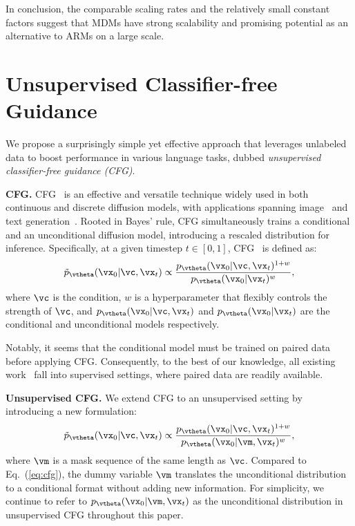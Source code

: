 \documentclass{article} %
\begin{document}
In conclusion, the comparable scaling rates and the relatively small constant factors suggest that MDMs have strong scalability and promising potential as an alternative to ARMs on a large scale.



\section{Unsupervised Classifier-free Guidance}
\label{sec:cfg}


We propose a surprisingly simple yet effective approach that leverages unlabeled data to boost performance in various language tasks, dubbed \emph{unsupervised classifier-free guidance (CFG)}.

\textbf{CFG.} CFG~\citep{ho2022classifier} is an effective and versatile technique widely used in both continuous and discrete diffusion models, with applications spanning image~\citep{ho2022classifier, chang2023muse} and text generation~\citep{lovelace2024diffusion}. Rooted in Bayes' rule, CFG simultaneously trains a conditional and an unconditional diffusion model, introducing a rescaled distribution for inference. Specifically, at a given timestep $t \in [0, 1]$, CFG~\citep{chang2023muse} is defined as:
\begin{align}
\label{eq:cfg}
\tilde{p}_{\vtheta}(\vx_0|\vc, \vx_t) \propto \frac{p_{\vtheta}(\vx_0|\vc, \vx_t)^{1+w}}{p_{\vtheta}(\vx_0|\vx_t)^w},
\end{align} 
where $\vc$ is the condition, $w$ is a hyperparameter that flexibly controls the strength of $\vc$, and $p_{\vtheta}(\vx_0|\vc, \vx_t)$ and $p_{\vtheta}(\vx_0|\vx_t)$ are the conditional and unconditional models respectively.

Notably, it seems that the conditional model must be trained on paired data before applying CFG. Consequently, to the best of our knowledge, all existing work~\citep{ho2022classifier, chang2023muse, lovelace2024diffusion} fall into supervised settings, where paired data are readily available.
 

\textbf{Unsupervised CFG.} We extend CFG to an unsupervised setting by introducing a new formulation:
\begin{align}
\label{eq:ucfg}
    \tilde{p}_{\vtheta}(\vx_0| \vc, \vx_t ) \propto \frac{p_{\vtheta}(\vx_0| \vc, \vx_t)^{1+w}}{p_{\vtheta}(\vx_0|\vm, \vx_t)^w},
\end{align}
where $\vm$ is a mask sequence of the same length as $\vc$. Compared to Eq.~(\ref{eq:cfg}), the dummy variable $\vm$ translates the unconditional distribution to a conditional format without adding new information. For simplicity, we continue to refer to 
$p_{\vtheta}(\vx_0|\vm, \vx_t)$ as the unconditional distribution in unsupervised CFG throughout this paper.
\end{document}
